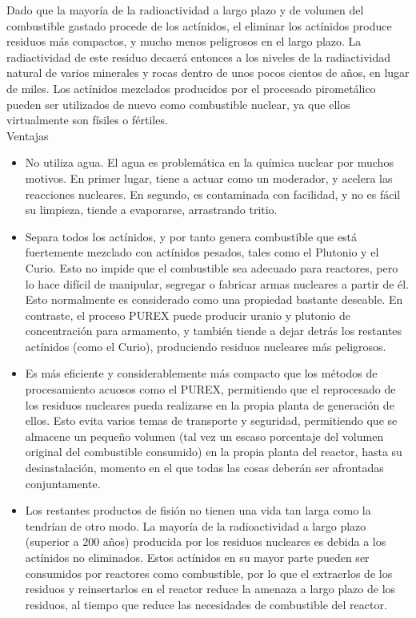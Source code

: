 \documentclass[]{article}
\begin{document}
Dado que la mayoría de la radioactividad a largo plazo y de volumen del combustible gastado procede de los actínidos, el eliminar los actínidos produce residuos más compactos, y mucho menos peligrosos en el largo plazo. La radiactividad de este residuo decaerá entonces a los niveles de la radiactividad natural de varios minerales y rocas dentro de unos pocos cientos de años, en lugar de miles. Los actínidos mezclados producidos por el procesado pirometálico pueden ser utilizados de nuevo como combustible nuclear, ya que ellos virtualmente son físiles o fértiles.\\

Ventajas
\begin{itemize}
	\item No utiliza agua. El agua es problemática en la química nuclear por muchos motivos. En primer lugar, tiene a actuar como un moderador, y acelera las reacciones nucleares. En segundo, es contaminada con facilidad, y no es fácil su limpieza, tiende a evaporarse, arrastrando tritio.
	\item Separa todos los actínidos, y por tanto genera combustible que está fuertemente mezclado con actínidos pesados, tales como el Plutonio y el Curio. Esto no impide que el combustible sea adecuado para reactores, pero lo hace difícil de manipular, segregar o fabricar armas nucleares a partir de él. Esto normalmente es considerado como una propiedad bastante deseable. En contraste, el proceso PUREX puede producir uranio y plutonio de concentración para armamento, y también tiende a dejar detrás los restantes actínidos (como el Curio), produciendo residuos nucleares más peligrosos.
	\item Es más eficiente y considerablemente más compacto que los métodos de procesamiento acuosos como el PUREX, permitiendo que el reprocesado de los residuos nucleares pueda realizarse en la propia planta de generación de ellos. Esto evita varios temas de transporte y seguridad, permitiendo que se almacene un pequeño volumen (tal vez un escaso porcentaje del volumen original del combustible consumido) en la propia planta del reactor, hasta su desinstalación, momento en el que todas las cosas deberán ser afrontadas conjuntamente.
	\item Los restantes productos de fisión no tienen una vida tan larga como la tendrían de otro modo. La mayoría de la radioactividad a largo plazo (superior a 200 años) producida por los residuos nucleares es debida a los actínidos no eliminados. Estos actínidos en su mayor parte pueden ser consumidos por reactores como combustible, por lo que el extraerlos de los residuos y reinsertarlos en el reactor reduce la amenaza a largo plazo de los residuos, al tiempo que reduce las necesidades de combustible del reactor.
	
\end{itemize}
\end{document}
